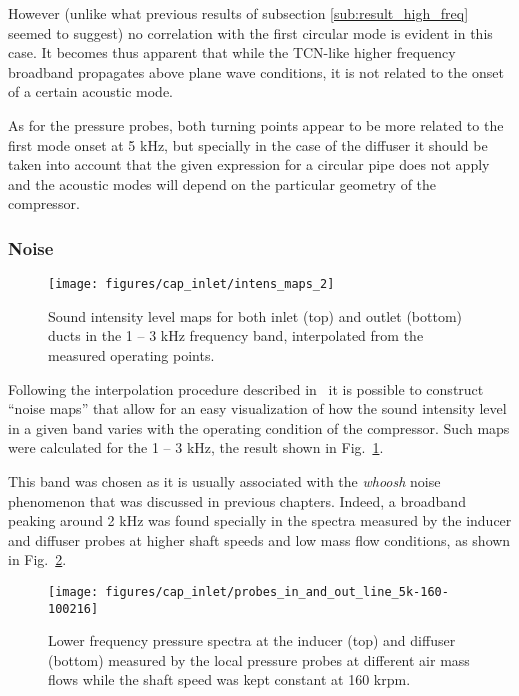 However (unlike what previous results of subsection \ref{sub:result_high_freq} seemed to suggest) no correlation with the first circular mode is evident in this case. It becomes thus apparent that while the TCN-like higher frequency broadband propagates above plane wave conditions, it is not related to the onset of a certain acoustic mode.

As for the pressure probes, both turning points appear to be more related to the first mode onset at 5 kHz, but specially in the case of the diffuser it should be taken into account that the given expression for a circular pipe does not apply and the acoustic modes will depend on the particular geometry of the compressor.

\subsubsection{Noise}

\begin{figure}[b!]
\centering
\texttt{[image: figures/cap\_inlet/intens\_maps\_2]}
\caption[SIL maps in the 1 -- 3 kHz band]{Sound intensity level maps for both inlet (top) and outlet (bottom) ducts in the 1 -- 3 kHz frequency band, interpolated from the measured operating points.}
\label{fig:intens_maps}
\end{figure}

Following the interpolation procedure described in~\cite{torregrosa2016experimental} it is possible to construct ``noise maps'' that allow for an easy visualization of how the sound intensity level in a given band varies with the operating condition of the compressor. Such maps were calculated for the 1 -- 3 kHz, the result shown in Fig.~\ref{fig:intens_maps}.

This band was chosen as it is usually associated with the \emph{whoosh} noise~\cite{evans2005minimizing,trochon2001new} phenomenon that was discussed in previous chapters. Indeed, a broadband peaking around 2 kHz was found specially in the spectra measured by the inducer and diffuser probes at higher shaft speeds and low mass flow conditions, as shown in Fig.~\ref{fig:probes_5K}.

\begin{figure}[thb!]
\centering
\texttt{[image: figures/cap\_inlet/probes\_in\_and\_out\_line\_5k-160-100216]}
\caption[Lower frequency spectra from the probes]{Lower frequency pressure spectra at the inducer (top) and diffuser (bottom) measured by the local pressure probes at different air mass flows while the shaft speed was kept constant at 160 krpm.}
\label{fig:probes_5K}
\end{figure}

